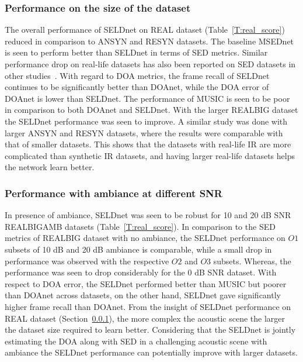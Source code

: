 \documentclass[journal]{IEEEtran}
\begin{document}
\subsubsection{Performance on the size of the dataset}\label{sssec:data_size}
The overall performance of SELDnet on REAL dataset (Table~\ref{T:real_score}) reduced in comparison to ANSYN and RESYN datasets. The baseline MSEDnet is seen to perform better than SELDnet in terms of SED metrics. Similar performance drop on real-life datasets has also been reported on SED datasets in other studies~\cite{emre_TASLP2016}. With regard to DOA metrics, the frame recall of SELDnet continues to be significantly better than DOAnet, while the DOA error of DOAnet is lower than SELDnet. The performance of MUSIC is seen to be poor in comparison to both DOAnet and SELDnet. With the larger REALBIG dataset the SELDnet performance was seen to improve. A similar study was done with larger ANSYN and RESYN datasets, where the results were comparable with that of smaller datasets. This shows that the datasets with real-life IR are more complicated than synthetic IR datasets, and having larger real-life datasets helps the network learn better.





\subsubsection{Performance with ambiance at different SNR}
In presence of ambiance, SELDnet was seen to be robust for 10 and 20 dB SNR REALBIGAMB datasets (Table~\ref{T:real_score}). In comparison to the SED metrics of REALBIG dataset with no ambiance, the SELDnet performance on $O1$ subsets of 10 dB and 20 dB ambiance is comparable, while a small drop in performance was observed with the respective $O2$ and $O3$ subsets. Whereas, the performance was seen to drop considerably for the 0 dB SNR dataset. With respect to DOA error, the SELDnet performed better than MUSIC but poorer than DOAnet across datasets, on the other hand, SELDnet gave significantly higher frame recall than DOAnet. From the insight of SELDnet performance on REAL dataset (Section~\ref{sssec:data_size}), the more complex the acoustic scene the larger the dataset size required to learn better. Considering that the SELDnet is jointly estimating the DOA along with SED in a challenging acoustic scene with ambiance the SELDnet performance can potentially improve with larger datasets.
\end{document}

